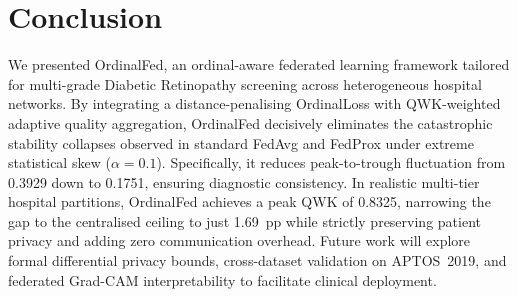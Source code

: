 \section{Conclusion}

We presented OrdinalFed, an ordinal-aware federated learning framework tailored
for multi-grade Diabetic Retinopathy screening across heterogeneous hospital
networks. By integrating a distance-penalising OrdinalLoss with QWK-weighted
adaptive quality aggregation, OrdinalFed decisively eliminates the catastrophic
stability collapses observed in standard FedAvg and FedProx under extreme
statistical skew ($\alpha=0.1$). Specifically, it reduces peak-to-trough
fluctuation from 0.3929 down to 0.1751, ensuring diagnostic consistency. In
realistic multi-tier hospital partitions, OrdinalFed achieves a peak QWK of
0.8325, narrowing the gap to the centralised ceiling to just 1.69~pp while
strictly preserving patient privacy and adding zero communication overhead.
Future work will explore formal differential privacy bounds, cross-dataset
validation on APTOS~2019, and federated Grad-CAM interpretability to facilitate
clinical deployment.

